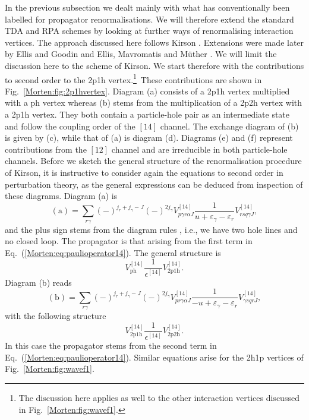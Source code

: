 In the previous subsection we dealt mainly with what has 
conventionally been labelled for propagator
renormalisations. We will therefore extend the standard TDA and RPA 
schemes by looking at further ways of renormalising   
interaction vertices. 
The approach discussed here follows 
Kirson \cite{Morten:kirson74}. Extensions were made later 
by Ellis and Goodin \cite{Morten:eg80} and
Ellis, Mavromatis and M\"uther \cite{Morten:emm91}. 
We will limit the discussion here to the scheme of Kirson.
We start therefore with the contributions to second
order to the 2p1h vertex.\footnote{The discussion here applies as well to the 
other interaction vertices discussed in Fig.~\ref{Morten:fig:wavef1}.}\ 
These contributions are shown in Fig.~\ref{Morten:fig:2p1hvertex}. 
Diagram (a) consists of a 2p1h vertex multiplied with a 
ph vertex whereas (b) stems from the multiplication
of a 2p2h vertex with a 2p1h vertex. They both contain
a particle-hole pair as an intermediate state and
follow the  coupling order of the $[14]$ channel.
The exchange diagram of (b)  is given by 
(c), while that of (a) is diagram (d). Diagrams (e) and (f)
represent contributions from the $[12]$ channel
and are irreducible in both particle-hole channels. 
Before we sketch the 
general structure of the renormalisation 
procedure of Kirson, it is instructive to consider
again the equations to second order in perturbation theory,
as the general expressions can be deduced from inspection
of these diagrams. 
Diagram (a) is
\begin{equation}
      \mathrm{(a)}=\sum_{r\gamma}(-)^{j_r+j_{\gamma}-J}
      (-)^{2j_{\gamma}}
      V^{[14]}_{p\gamma r\alpha J}
      \frac{1}{u+\varepsilon_{\gamma}-
                \varepsilon_{r}} V^{[14]}_{rsq\gamma J},
       \label{Morten:eq:2p1ha}
\end{equation}
and the plus sign stems 
from the diagram rules \cite{Morten:kstop81}, 
i.e., we
have two hole lines and no closed loop.
The propagator is that arising
from the first term in Eq.~(\ref{Morten:eq:paulioperator14}).
The  general structure is
\begin{equation}
     V_{\mathrm{ph}}^{[14]}
     \frac{1}{\epsilon^{[14]}}
     V_{\mathrm{2p1h}}^{[14]}.
     \label{Morten:eq:2p1hseca}
\end{equation}
Diagram (b) reads
\begin{equation}
      \mathrm{(b)}=\sum_{r\gamma}(-)^{j_r+j_{\gamma}-J}
      (-)^{2j_{\gamma}}
      V^{[14]}_{pr\gamma\alpha J}
      \frac{1}{-u+\varepsilon_{\gamma}-
                \varepsilon_r} V^{[14]}_{\gamma sqr J},
       \label{Morten:eq:2p1hb}
\end{equation}
with the following structure
\begin{equation}
     V_{\mathrm{2p1h}}^{[14]}
     \frac{1}{\epsilon^{[14]}}
     V_{\mathrm{2p2h}}^{[14]}.
     \label{Morten:eq:2p1hsecb}
\end{equation}
In this case the propagator stems from the second term
in Eq.~(\ref{Morten:eq:paulioperator14}).
Similar equations arise for  the 2h1p
vertices of Fig.~\ref{Morten:fig:wavef1}. 

